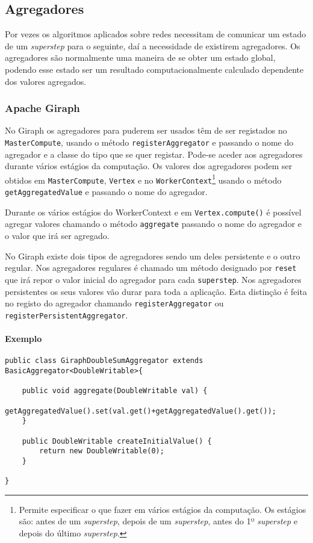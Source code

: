 \newpage

\subsection{Agregadores}
\label{ss:agreg}
  Por vezes os algoritmos aplicados sobre redes necessitam de comunicar um 
estado de um \textit{superstep} para o seguinte, daí a necessidade de existirem 
agregadores. Os agregadores são normalmente uma maneira de se obter um estado 
global, podendo esse estado ser um resultado computacionalmente calculado 
dependente dos valores agregados.

  \subsubsection*{Apache Giraph}
    No Giraph os agregadores para puderem ser usados têm de ser registados no 
\texttt{MasterCompute}, usando o método \texttt{registerAggregator} e
    passando o nome do agregador e a classe do tipo que se quer registar. 
Pode-se aceder aos agregadores durante vários estágios da computação.
    Os valores dos agregadores podem ser obtidos em \texttt{MasterCompute}, 
\texttt{Vertex} e no \texttt{WorkerContext}\footnote{Permite 
especificar o que fazer em vários estágios da computação. Os estágios são: 
antes de um \textit{superstep}, depois de um \textit{superstep}, antes do 1º \textit{superstep} e depois do 
último \textit{superstep}.} usando o método \texttt{getAggregatedValue} e 
passando
    o nome do agregador.
    
    Durante os vários estágios do WorkerContext e em \texttt{Vertex.compute()} é possível agregar valores chamando o 
método \texttt{aggregate} passando o nome do agregador e o valor que irá ser agregado.
    
    No Giraph existe dois tipos de agregadores sendo um deles persistente e o 
outro regular. Nos agregadores regulares é chamado um método
    designado por \texttt{reset} que irá repor o valor inicial do agregador 
para cada \texttt{superstep}. Nos agregadores persistentes os seus valores vão 
durar
    para toda a aplicação. Esta distinção é feita no registo do agregador chamando \texttt{registerAggregator} 
    ou \texttt{registerPersistentAggregator}.
    
\paragraph{Exemplo}
\begin{verbatim}
public class GiraphDoubleSumAggregator extends BasicAggregator<DoubleWritable>{

	public void aggregate(DoubleWritable val) {
		getAggregatedValue().set(val.get()+getAggregatedValue().get());
	}

	public DoubleWritable createInitialValue() {
		return new DoubleWritable(0);
	}

}
\end{verbatim} 

